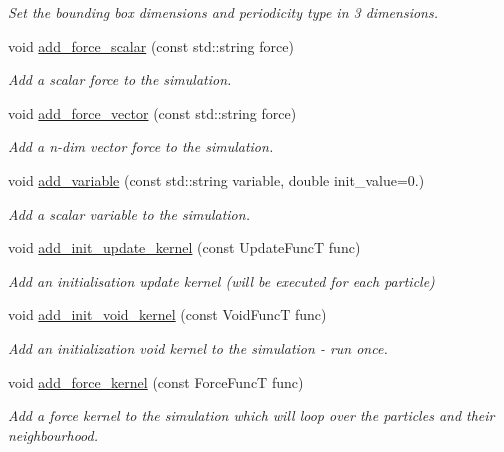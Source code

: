 \begin{DoxyCompactItemize}
\begin{DoxyCompactList}\small\item\em Set the bounding box dimensions and periodicity type in 3 dimensions. \end{DoxyCompactList}\item 
void \mbox{\hyperlink{namespacewash_a6103b7efdcc3045c8d2aae4d5598e7ae}{add\+\_\+force\+\_\+scalar}} (const std\+::string force)
\begin{DoxyCompactList}\small\item\em Add a scalar force to the simulation. \end{DoxyCompactList}\item 
void \mbox{\hyperlink{namespacewash_a9f85f4ec09db604cb09806616365a5b8}{add\+\_\+force\+\_\+vector}} (const std\+::string force)
\begin{DoxyCompactList}\small\item\em Add a n-\/dim vector force to the simulation. \end{DoxyCompactList}\item 
void \mbox{\hyperlink{namespacewash_ae40d87ba5e1d4b16f1cc52932a030b3d}{add\+\_\+variable}} (const std\+::string variable, double init\+\_\+value=0.)
\begin{DoxyCompactList}\small\item\em Add a scalar variable to the simulation. \end{DoxyCompactList}\item 
void \mbox{\hyperlink{namespacewash_a2bed8ccfb6599a8edd0eb88037d8c8af}{add\+\_\+init\+\_\+update\+\_\+kernel}} (const Update\+FuncT func)
\begin{DoxyCompactList}\small\item\em Add an initialisation update kernel (will be executed for each particle) \end{DoxyCompactList}\item 
void \mbox{\hyperlink{namespacewash_a4aa9c050821f26f11d51e72a861a1102}{add\+\_\+init\+\_\+void\+\_\+kernel}} (const Void\+FuncT func)
\begin{DoxyCompactList}\small\item\em Add an initialization void kernel to the simulation -\/ run once. \end{DoxyCompactList}\item 
void \mbox{\hyperlink{namespacewash_a2ffa21a9e32d3ca6ce87def3e7db4837}{add\+\_\+force\+\_\+kernel}} (const Force\+FuncT func)
\begin{DoxyCompactList}\small\item\em Add a force kernel to the simulation which will loop over the particles and their neighbourhood. \end{DoxyCompactList}\item 

\end{DoxyCompactItemize}
